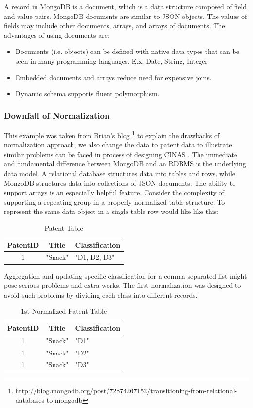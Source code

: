 \documentclass{sig-alternate}
\begin{document}
{A record in MongoDB is a document, which is a data structure composed of field and value pairs. MongoDB documents are similar to JSON objects. The values of fields may include other documents, arrays, and arrays of documents. The advantages of using documents are:
\begin{itemize}
\item Documents (i.e. objects) can be defined with native data types that can be seen in many programming languages. E.x: Date, String, Integer
\item Embedded documents and arrays reduce need for expensive joins.
\item Dynamic schema supports fluent polymorphism.
\end{itemize}

\subsubsection{Downfall of Normalization }
This example was taken from Brian's blog \footnote{http://blog.mongodb.org/post/72874267152/transitioning-from-relational-databases-to-mongodb} to explain the drawbacks of normalization approach, we also change the data to patent data to illustrate similar problems can be faced in process of designing CINAS . The immediate and fundamental difference between MongoDB and an RDBMS is the underlying data model. A relational database structures data into tables and rows, while MongoDB structures data into collections of JSON documents. The ability to support arrays is an especially helpful feature. Consider the complexity of supporting a repeating group in a properly normalized table structure. To represent the same data object in a single table row would like like this:
\begin{table}[htb]
\begin{tabular}{|c|c|l|} \hline
PatentID&Title&Classification\\ \hline
1& "Snack"& "D1, D2, D3"\\ \hline
\end{tabular}
\centering
\caption{Patent Table}
\end{table}
Aggregation and updating specific classification for a comma separated list might pose serious problems and extra works. The first normalization was designed to avoid such problems by dividing each class into different records.

\begin{table}[htb]
\begin{tabular}{|c|c|l|} \hline
PatentID&Title&Classification\\ \hline
1& "Snack"& "D1"\\ \hline
1& "Snack"& "D2"\\ \hline
1& "Snack"& "D3"\\ \hline
\end{tabular}
\centering
\caption{1st Normalized Patent Table}
\end{table}

}
\end{document}
